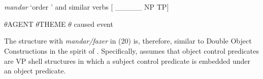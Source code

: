 \documentclass[output=paper]{langsci/langscibook}
\begin{document}
\ea%
    \label{ex:key:20}
    \gll\\
        \\
    \glt
    \z

          \textit{mandar} ‘order ’ and similar verbs [     \_\_\_\_\_         NP                  TP]

                      $\theta $AGENT  $\theta $THEME   $\theta $ caused event

 

The structure with \textit{mandar/fazer} in (20) is, therefore, similar to Double Object Constructions in the spirit of \citet{Larson1988}. Specifically, \citet{Larson1988} assumes that object control predicates are VP shell structures in which a subject control predicate is embedded under an object predicate.
\end{document}
